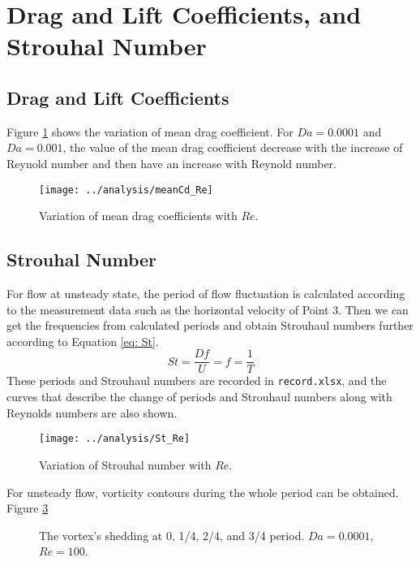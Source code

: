 \section{Drag and Lift Coefficients, and Strouhal Number}
\subsection{Drag and Lift Coefficients}
Figure \ref{fig: meanCd} shows the variation of mean drag coefficient. For $Da=0.0001$ and $Da=0.001$, the value of the mean drag coefficient decrease with the increase of Reynold number and then have an increase with Reynold number.

\begin{figure}[]
	\centering
	\texttt{[image: ../analysis/meanCd\_Re]}
	\caption{Variation of mean drag coefficients with $Re$.}
	\label{fig: meanCd}
\end{figure}

\subsection{Strouhal Number}
For flow at unsteady state, the period of flow fluctuation is calculated according to the measurement data such as the horizontal velocity of Point 3. Then we can get the frequencies from calculated periods and obtain Strouhaul numbers further according to Equation \ref{eq: St}.
\begin{equation}\label{eq: St}
St = \frac{Df}{U} = f = \frac{1}{T}
\end{equation}
These periods and Strouhaul numbers are recorded in \texttt{record.xlsx}, and the curves that describe the change of periods and Strouhaul numbers along with Reynolds numbers are also shown.

\begin{figure}[]
	\centering
	\texttt{[image: ../analysis/St\_Re]}
	\caption{Variation of Strouhal number with $Re$.}
	\label{fig: St}
\end{figure}

For unsteady flow, vorticity contours during the whole period can be obtained. Figure \ref{fig: 4*vortex}

\begin{figure}[]
	\centering
	\begin{minipage}{\textwidth}
		\centering
	\end{minipage}
	\centering
	\begin{minipage}{\textwidth}
		\centering
	\end{minipage}
	\caption{The vortex's shedding at 0, 1/4, 2/4, and 3/4 period.
		$Da=0.0001$, $Re=100$.}
	\label{fig: 4*vortex}
\end{figure}


